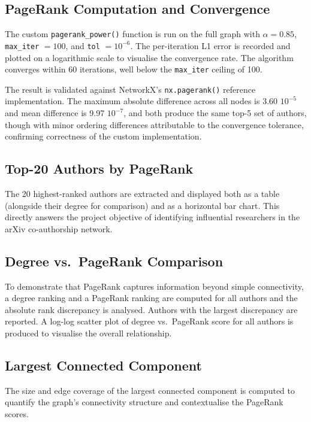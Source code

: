 \documentclass[12pt, a4paper]{article}
\begin{document}
\subsection{PageRank Computation and Convergence}

The custom \texttt{pagerank\_power()} function is run on the full graph with $\alpha = 0.85$, \texttt{max\_iter} $= 100$, and \texttt{tol} $= 10^{-6}$. The per-iteration L1 error is recorded and plotted on a logarithmic scale to visualise the convergence rate. The algorithm converges within 60 iterations, well below the \texttt{max\_iter} ceiling of 100.

The result is validated against NetworkX's \texttt{nx.pagerank()} reference implementation. The maximum absolute difference across all nodes is 3.60 \times $10^{-5}$ and mean difference is 9.97 \times $10^{-7}$, and both produce the same top-5 set of authors, though with minor ordering differences attributable to the convergence tolerance, confirming correctness of the custom implementation.

\subsection{Top-20 Authors by PageRank}

The 20 highest-ranked authors are extracted and displayed both as a table (alongside their degree for comparison) and as a horizontal bar chart. This directly answers the project objective of identifying influential researchers in the arXiv co-authorship network.

\subsection{Degree vs.\ PageRank Comparison}

To demonstrate that PageRank captures information beyond simple connectivity, a degree ranking and a PageRank ranking are computed for all authors and the absolute rank discrepancy is analysed. Authors with the largest discrepancy are reported. A log-log scatter plot of degree vs.\ PageRank score for all authors is produced to visualise the overall relationship.

\subsection{Largest Connected Component}

The size and edge coverage of the largest connected component is computed to quantify the graph's connectivity structure and contextualise the PageRank scores.
\end{document}
